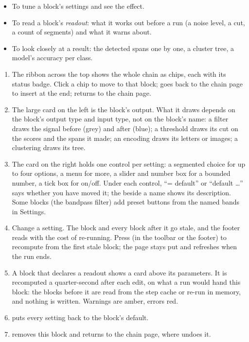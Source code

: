 \begin{itemize}
  \item To tune a block's settings and see the effect.
  \item To read a block's \emph{readout}: what it works out before a run (a noise level, a cut,
        a count of segments) and what it warns about.
  \item To look closely at a result: the detected spans one by one, a cluster tree, a model's
        accuracy per class.
\end{itemize}


\begin{enumerate}
  \item The ribbon across the top shows the whole chain as chips, each with its status badge.
        Click a chip to move to that block;  goes back to the chain page to insert at
        the end;  returns to the chain page.
  \item The large card on the left is the block's output. What it draws depends on the block's
        output type and input type, not on the block's name: a filter draws the signal before
        (grey) and after (blue); a threshold draws its cut on the scores and the spans it made;
        an encoding draws its letters or images; a clustering draws its tree.
  \item The  card on the right holds one control per setting: a segmented choice
        for up to four options, a menu for more, a slider and number box for a bounded number, a
        tick box for on/off. Under each control, ``= default'' or ``default \ldots'' says whether
        you have moved it; the  beside a name shows its description. Some blocks (the
        bandpass filter) add preset buttons from the named bands in Settings.
  \item Change a setting. The block and every block after it go stale, and the footer reads
         with the cost of re-running. Press  (in the
        toolbar or the footer) to recompute from the first stale block; the page stays put and
        refreshes when the run ends.
  \item A block that declares a readout shows a  card above its parameters. It is
        recomputed a quarter-second after each edit, on what a run would hand this block: the
        blocks before it are read from the step cache or re-run in memory, and nothing is written.
        Warnings are amber, errors red.
  \item {} puts every setting back to the block's default.
  \item {} removes this block and returns to the chain page, where
         undoes it.
\end{enumerate}

